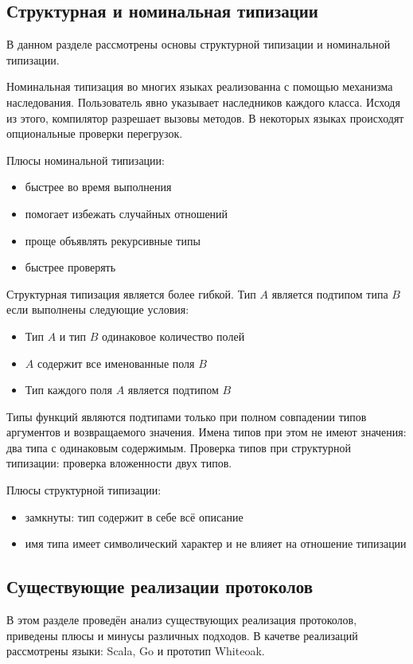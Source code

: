 \subsection{Структурная и номинальная типизации}
В данном разделе рассмотрены основы структурной типизации и номинальной типизации.

Номинальная типизация во многих языках реализованна с помощью механизма наследования. Пользователь явно указывает наследников каждого класса. Исходя из этого, компилятор разрешает вызовы методов. В некоторых языках происходят опциональные проверки перегрузок.

Плюсы номинальной типизации:
\begin{itemize}
    \item быстрее во время выполнения
    \item помогает избежать случайных отношений
    \item проще объявлять рекурсивные типы
    \item быстрее проверять
\end{itemize}

Структурная типизация является более гибкой. Тип $A$ является подтипом типа $B$ если выполнены следующие условия:
\begin{itemize}
    \item Тип $A$ и тип $B$ одинаковое количество полей
    \item $A$ содержит все именованные поля $B$
    \item Тип каждого поля $A$ является подтипом $B$
\end{itemize}
Типы функций являются подтипами только при полном совпадении типов аргументов и возвращаемого значения. Имена типов при этом не имеют значения: два типа с одинаковым содержимым. Проверка типов при структурной типизации: проверка вложенности двух типов.

Плюсы структурной типизации:
\begin{itemize}
    \item замкнуты: тип содержит в себе всё описание
    \item имя типа имеет символический характер и не влияет на отношение типизации
\end{itemize}

\subsection{Существующие реализации протоколов}
В этом разделе проведён анализ существующих реализация протоколов, приведены плюсы и минусы различных подходов. В качетве реализаций рассмотрены языки: Scala, Go и прототип Whiteoak.

